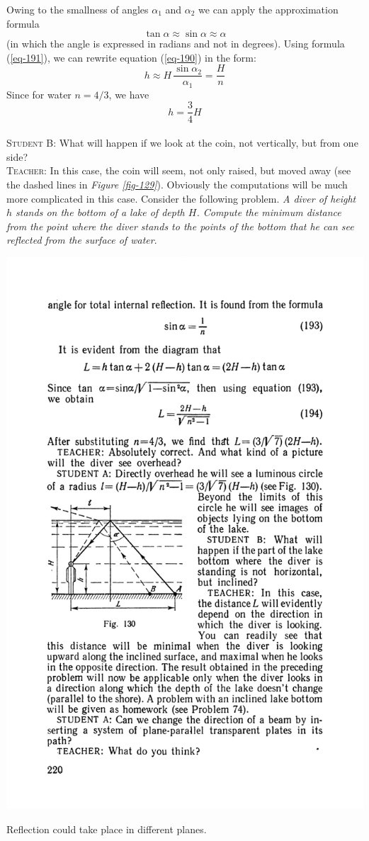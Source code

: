 \documentclass[a4paper,sfsidenotes]{tufte-book}
\begin{document}
Owing to the smallness of angles $\alpha_{1}$ and $\alpha_{2}$ we can apply the approximation formula
 \begin{equation}
\tan \alpha \approx \sin \alpha \approx \alpha 
\label{eq-191}
\end{equation}
(in which the angle is expressed in radians and not in degrees). Using formula (\ref{eq-191}), we can rewrite equation (\ref{eq-190}) in the form:
\begin{equation}
h \approx H \, \frac{\sin \alpha_{2}}{\alpha_{1}} = \frac{H}{n}
\label{eq-192}
\end{equation}
Since for water $n = 4/3$, we have
\begin{equation*}
h = \frac{3}{4}H
\end{equation*}
\\
\textsc{Student B:} What will happen if we look at the coin, not vertically, but from one side?
\\
\textsc{Teacher:} In this case, the coin will seem, not only raised, but moved away (see the dashed lines in \emph{Figure \ref{fig-129}}). Obviously the computations will be much more complicated in this case. Consider the following problem. \emph{A diver of height $h$ stands on the bottom of a lake of depth $H$. Compute the minimum distance from the point where the diver stands to the points of the bottom that he can see reflected from the surface of water}.
\begin{marginfigure}%
\centering
\includegraphics[width=.9\linewidth]{fig-130a}
\caption{ Reflection could take place in different planes.}
\label{fig-130}
\end{marginfigure}
\end{document}
